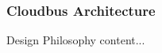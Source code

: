 \begin{frame}
	\frametitle{Cloudbus Architecture}
	\begin{block}{Design Philosophy}
		content...
	\end{block}
\end{frame}